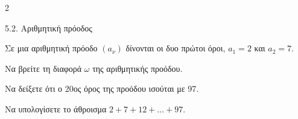 \begin{ylh}{2}
    \item 5.2. Αριθμητική πρόοδος
\end{ylh}
Σε μια αριθμητική πρόοδο $(a_\nu)$ δίνονται οι δυο πρώτοι όροι, $a_1 = 2$ και $a_2 = 7$.
\begin{alist}
\item Να βρείτε τη διαφορά $\omega$ της αριθμητικής προόδου. 
\item Να δείξετε ότι ο 20ος όρος της προόδου ισούται με 97. 
\item Να υπολογίσετε το άθροισμα $2 + 7 + 12 + \dots + 97$.
\end{alist}

